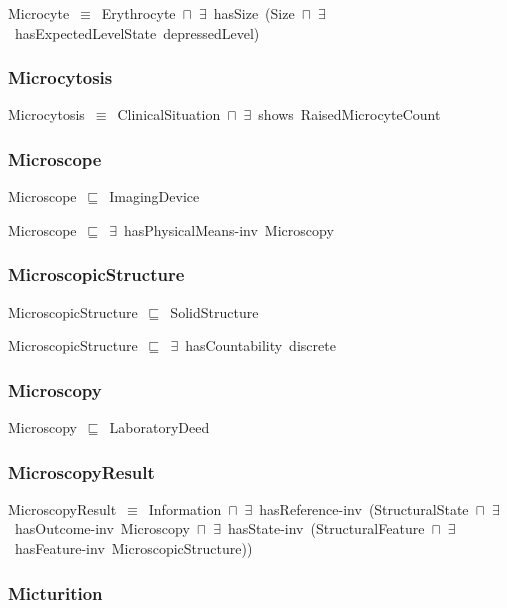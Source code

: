 \documentclass{article}
\begin{document}
Microcyte~\ensuremath{\equiv}~Erythrocyte~\ensuremath{\sqcap}~\ensuremath{\exists}~hasSize~(Size~\ensuremath{\sqcap}~\ensuremath{\exists}~hasExpectedLevelState~depressedLevel)

\subsubsection*{Microcytosis}

Microcytosis~\ensuremath{\equiv}~ClinicalSituation~\ensuremath{\sqcap}~\ensuremath{\exists}~shows~RaisedMicrocyteCount

\subsubsection*{Microscope}

Microscope~\ensuremath{\sqsubseteq}~ImagingDevice~

Microscope~\ensuremath{\sqsubseteq}~\ensuremath{\exists}~hasPhysicalMeans-inv~Microscopy~

\subsubsection*{MicroscopicStructure}

MicroscopicStructure~\ensuremath{\sqsubseteq}~SolidStructure~

MicroscopicStructure~\ensuremath{\sqsubseteq}~\ensuremath{\exists}~hasCountability~discrete~

\subsubsection*{Microscopy}

Microscopy~\ensuremath{\sqsubseteq}~LaboratoryDeed~

\subsubsection*{MicroscopyResult}

MicroscopyResult~\ensuremath{\equiv}~Information~\ensuremath{\sqcap}~\ensuremath{\exists}~hasReference-inv~(StructuralState~\ensuremath{\sqcap}~\ensuremath{\exists}~hasOutcome-inv~Microscopy~\ensuremath{\sqcap}~\ensuremath{\exists}~hasState-inv~(StructuralFeature~\ensuremath{\sqcap}~\ensuremath{\exists}~hasFeature-inv~MicroscopicStructure))

\subsubsection*{Micturition}
\end{document}
